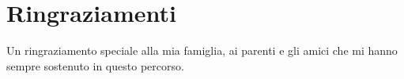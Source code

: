 

\chapter*{Ringraziamenti}
\thispagestyle{empty}
Un ringraziamento speciale alla mia famiglia, ai parenti e gli amici che mi hanno sempre sostenuto in questo percorso.
